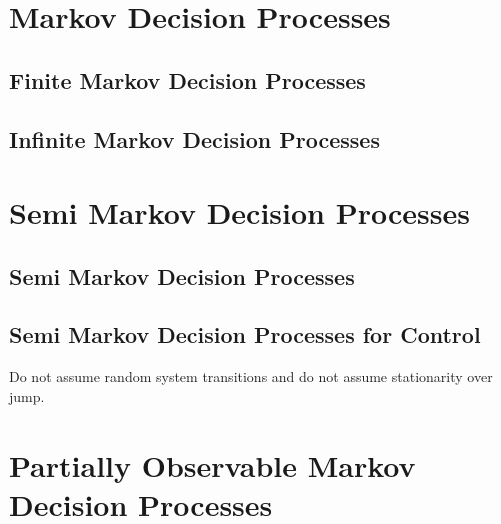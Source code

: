 %
%

\section{Markov Decision Processes}
\subsection{Finite Markov Decision Processes}
\subsection{Infinite Markov Decision Processes}

\section{Semi Markov Decision Processes}
\subsection{Semi Markov Decision Processes}
\subsection{Semi Markov Decision Processes for Control}
Do not assume random system transitions and do not assume stationarity over jump.

\section{Partially Observable Markov Decision Processes}
